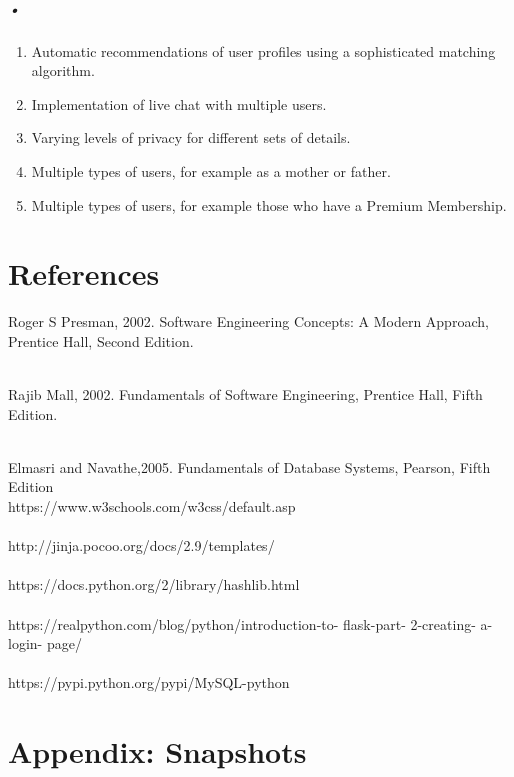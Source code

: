 \documentclass[12pt]{report}
\begin{document}
\paragraph*{•}
 
\begin{enumerate}
\item Automatic recommendations of user profiles using a sophisticated matching algorithm.  
\item Implementation of live chat with multiple users.
\item Varying levels of privacy for different sets of details.
\item Multiple types of users, for example as a mother or father.
\item Multiple types of users, for example those who have a Premium Membership. 

\end{enumerate}

\chapter{References} 


\noindent [1] Roger S Presman, 2002. Software Engineering Concepts: A Modern Approach, Prentice Hall, Second Edition. \\\

\noindent [2] Rajib Mall, 2002. Fundamentals of Software Engineering, Prentice Hall, Fifth Edition. \\\

\noindent [3] Elmasri and Navathe,2005. Fundamentals of Database Systems, Pearson, Fifth Edition \\



\noindent [4] https://www.w3schools.com/w3css/default.asp \\\\
\noindent [5] http://jinja.pocoo.org/docs/2.9/templates/\\\\
\noindent [6] https://docs.python.org/2/library/hashlib.html \\\\
\noindent [7] https://realpython.com/blog/python/introduction-to- flask-part- 2-creating- a-login-
page/ \\\\
\noindent [8] https://pypi.python.org/pypi/MySQL-python


\chapter{Appendix: Snapshots} 
\end{document}
